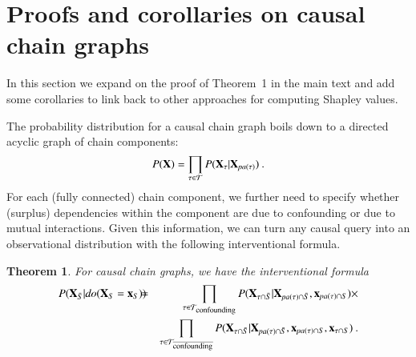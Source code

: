 \documentclass{article}
\newcommand{\vX}{\mathbf{X}}
\newcommand{\vx}{\mathbf{x}}
\newcommand{\dodo}{\mathit{do}}
\newcommand{\lvdo}[1]{\dodo(\vX_{#1} = \vx_{#1})}
\newcommand{\spa}{\mathop{\textit{\scriptsize pa}}}
\newcommand{\isequal}{\hspace*{-2.5mm} & = & \hspace*{-2.5mm}}
\newcommand{\chaincomponents}{{\cal T}}
\newtheorem{theorem}{Theorem}
\begin{document}
\section{Proofs and corollaries on causal chain graphs}

In this section we expand on the proof of Theorem~1 in the main text and add some corollaries to link back to other approaches for computing Shapley values.

The probability distribution for a causal chain graph boils down to a directed acyclic graph of chain components:
\begin{equation}
P(\vX) = \prod_{\tau \in \chaincomponents} P(\vX_\tau|\vX_{\spa(\tau)}) \: .
\label{eq:chaingraph}
\end{equation}
For each (fully connected) chain component, we further need to specify whether (surplus) dependencies within the component are due to confounding or due to mutual interactions. Given this information, we can turn any causal query into an observational distribution with the following interventional formula.

\begin{theorem}
	For causal chain graphs, we have the interventional formula 
	\begin{eqnarray}
	P(\vX_{\bar{S}}|\lvdo{S}) \isequal \prod_{\tau \in \chaincomponents_{\textrm{\upshape \scriptsize confounding}}} P(\vX_{\tau \cap \bar{S}}|\vX_{\spa(\tau)  \cap \bar{S}},\vx_{\spa(\tau) \cap S}) \times \nonumber \\
	&& \prod_{\tau \in \chaincomponents_{\overline{\textrm{\upshape \scriptsize confounding}}}} P(\vX_{\tau \cap \bar{S}}|\vX_{\spa(\tau) \cap \bar{S}},\vx_{\spa(\tau) \cap S},\vx_{\tau \cap S}) \: .
	\label{eq:chaininterventional}
	\end{eqnarray}
\end{theorem}
\end{document}
